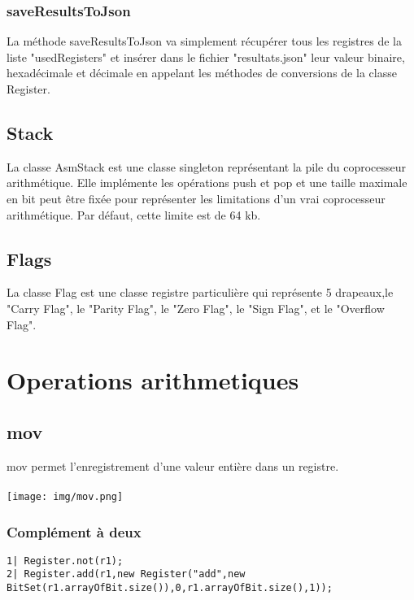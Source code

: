 \documentclass{article}
\begin{document}
\subsubsection{saveResultsToJson}

La méthode saveResultsToJson va simplement récupérer tous les registres de la liste "usedRegisters" et insérer dans le fichier "resultats.json"
leur valeur binaire, hexadécimale et décimale en appelant les méthodes de conversions de la classe Register.


\subsection{Stack}

La classe AsmStack est une classe singleton représentant la pile du coprocesseur arithmétique. Elle implémente les opérations push et pop et
une taille maximale en bit peut être fixée pour représenter les limitations d'un vrai coprocesseur arithmétique. Par défaut, cette limite est de 64 kb.

\subsection{Flags}

La classe Flag est une classe registre particulière qui représente 5 drapeaux,le "Carry Flag", le "Parity Flag", le "Zero Flag", le "Sign Flag", et le "Overflow Flag".

\section{Operations arithmetiques}
\subsection{mov}
mov permet l'enregistrement d'une valeur entière dans un registre.
\\
\\
\texttt{[image: img/mov.png]}

\subsubsection{Complément à deux}

\begin{verbatim}
1| Register.not(r1);
2| Register.add(r1,new Register("add",new BitSet(r1.arrayOfBit.size()),0,r1.arrayOfBit.size(),1));
\end{verbatim}
\end{document}
